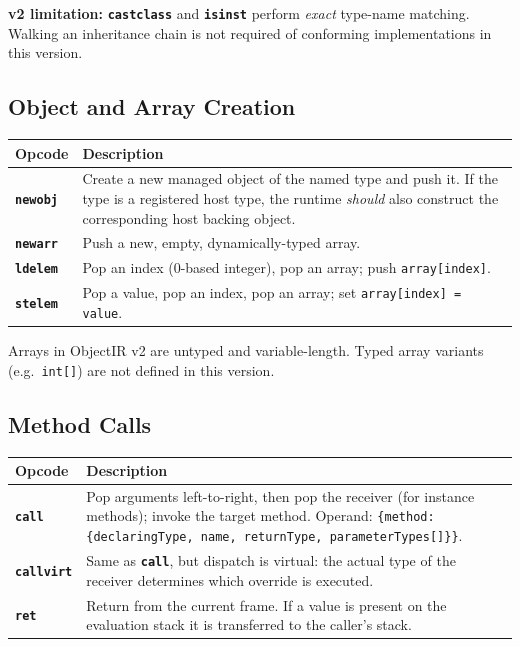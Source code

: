 \documentclass[11pt,a4paper]{article}
\newcommand{\code}[1]{\texttt{\small #1}}
\newcommand{\opcode}[1]{\textbf{\texttt{#1}}}
\begin{document}
\begin{warnbox}
\textbf{v2 limitation:} \opcode{castclass} and \opcode{isinst} perform
\emph{exact} type-name matching. Walking an inheritance chain is not required
of conforming implementations in this version.
\end{warnbox}

\subsection{Object and Array Creation}

\begin{longtable}{lp{10.5cm}}
  \toprule
  \textbf{Opcode}  & \textbf{Description} \\
  \midrule
  \endhead
  \opcode{newobj}  &
    Create a new managed object of the named type and push it. If the type
    is a registered host type, the runtime \textit{should} also construct
    the corresponding host backing object. \\
  \opcode{newarr}  &
    Push a new, empty, dynamically-typed array. \\
  \opcode{ldelem}  &
    Pop an index (0-based integer), pop an array;
    push \texttt{array[index]}. \\
  \opcode{stelem}  &
    Pop a value, pop an index, pop an array;
    set \texttt{array[index] = value}. \\
  \bottomrule
\end{longtable}

\begin{notebox}
Arrays in ObjectIR v2 are untyped and variable-length. Typed array variants
(e.g.\ \texttt{int[]}) are not defined in this version.
\end{notebox}

\subsection{Method Calls}

\begin{longtable}{lp{10.5cm}}
  \toprule
  \textbf{Opcode}   & \textbf{Description} \\
  \midrule
  \endhead
  \opcode{call}     &
    Pop arguments left-to-right, then pop the receiver (for instance
    methods); invoke the target method.
    Operand: \code{\{method: \{declaringType, name, returnType,
    parameterTypes[]\}\}}. \\
  \opcode{callvirt} &
    Same as \opcode{call}, but dispatch is virtual: the actual type of the
    receiver determines which override is executed. \\
  \opcode{ret}      &
    Return from the current frame. If a value is present on the evaluation
    stack it is transferred to the caller's stack. \\
  \bottomrule
\end{longtable}
\end{document}
